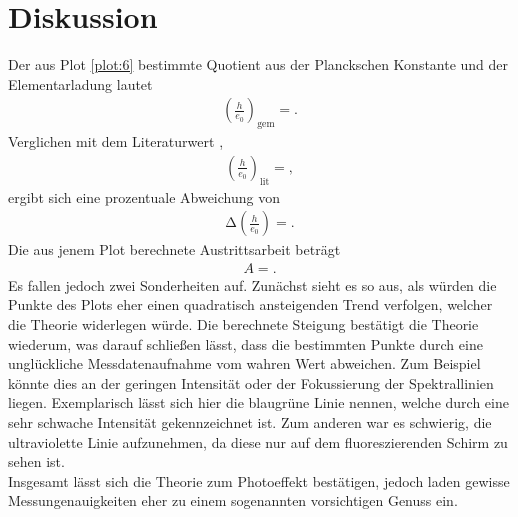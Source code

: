 \section{Diskussion}
\label{sec:Diskussion}



Der aus Plot \ref{plot:6} bestimmte Quotient aus der Planckschen Konstante und der Elementarladung lautet
\begin{align*}
  \left(\frac{h}{e_0}\right)_{\text{gem}} = .
\end{align*}
Verglichen mit dem Literaturwert \cite{Konstanten},
\begin{align*}
  \left(\frac{h}{e_0}\right)_{\text{lit}} = ,
\end{align*}
ergibt sich eine prozentuale Abweichung von
\begin{align*}
  \increment{\left(\frac{h}{e_0}\right)} = .
\end{align*}
Die aus jenem Plot berechnete Austrittsarbeit beträgt
\begin{align*}
  A = .
\end{align*}
Es fallen jedoch zwei Sonderheiten auf.
Zunächst sieht es so aus, als würden die Punkte des Plots eher einen quadratisch ansteigenden Trend verfolgen, welcher die Theorie widerlegen würde.
Die berechnete Steigung bestätigt die Theorie wiederum, was darauf schließen lässt, dass die bestimmten Punkte durch eine unglückliche Messdatenaufnahme vom wahren Wert abweichen.
Zum Beispiel könnte dies an der geringen Intensität oder der Fokussierung der Spektrallinien liegen. Exemplarisch lässt sich hier die blaugrüne Linie nennen, welche durch eine sehr schwache Intensität gekennzeichnet ist.
Zum anderen war es schwierig, die ultraviolette Linie aufzunehmen, da diese nur auf dem fluoreszierenden Schirm zu sehen ist.\\
Insgesamt lässt sich die Theorie zum Photoeffekt bestätigen, jedoch laden gewisse Messungenauigkeiten eher zu einem sogenannten vorsichtigen Genuss ein.
